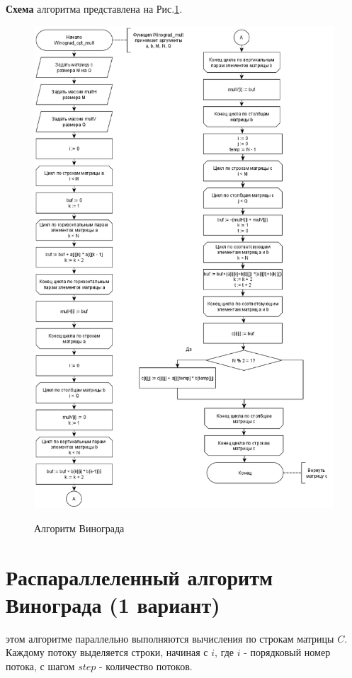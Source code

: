 \textbf{Схема} алгоритма представлена на Рис.\ref{fig1:image}.\\
\begin{figure}[pt!]
	\begin{center}
		{\includegraphics[scale = 0.52]{schemes/opt_winograd}}
		\caption{Алгоритм Винограда}
		\label{fig1:image}
	\end{center}
\end{figure}

\section{Распараллеленный алгоритм Винограда (1 вариант)}
 этом алгоритме параллельно выполняются вычисления по строкам матрицы $C$. Каждому потоку выделяется строки, начиная с $i$, где $i$ - порядковый номер потока, с шагом $step$ - количество потоков.

